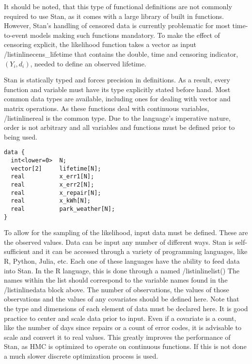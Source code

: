 It should be noted, that this type of functional definitions are not commonly required to use Stan, as it comes with a large library of built in functions\cite{StanDevelopmentTeam2016}. However, Stan's handling of censored data is currently problematic for most time-to-event models making such functions mandatory. To make the effect of censoring explicit, the likelihood function takes a vector as input /listinline{cens\_lifetime} that contains the double, time and censoring indicator, $(Y_i,d_i)$, needed to define an observed lifetime. 

Stan is statically typed and forces precision in definitions. As a result, every function and variable must have its type explicitly stated before hand. Most common data types are available, including ones for dealing with vector and matrix operations. As these functions deal with continuous variables, /listinline{real} is the common type. Due to the language's imperative nature, order is not arbitrary and all variables and functions must be defined prior to being used. 


\begin{lstlisting}
data {
  int<lower=0>  N;
  vector[2]     lifetime[N];
  real          x_err1[N];
  real          x_err2[N];
  real          x_repair[N];
  real          x_kWh[N];
  real          park_weather[N];
}
\end{lstlisting}


To allow for the sampling of the likelihood, input data must be defined. These are the observed values. Data can be input any number of different ways. Stan is self-sufficient and it can be accessed through a variety of programming languages, like R, Python, Julia, etc. Each one of these languages have the ability to feed data into Stan. In the R language, this is done through a named /listinline{list()} The names within the list should correspond to the variable names found in the /listinline{data{}} block above. The number of observations, the values of those observations and the values of any covariates should be defined here. Note that the type and dimensions of each element of data must be declared here. It is good practice to center and scale data prior to input. Even if a covariate is a count, like the number of days since repairs or a count of error codes, it is advisable to scale and convert it to real values. This greatly improves the performance of Stan, as HMC is optimized to operate on continuous functions. If this is not done a much slower discrete optimization process is used. 



